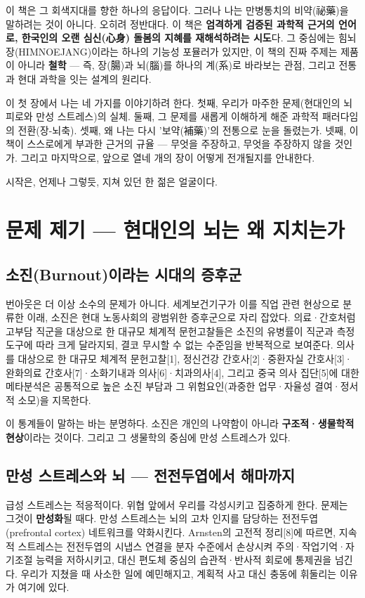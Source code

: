 \documentclass[11pt,oneside]{book}
\begin{document}
이 책은 그 회색지대를 향한 하나의 응답이다. 그러나 나는 만병통치의 비약(祕藥)을 말하려는 것이 아니다. 오히려 정반대다. 이 책은 \textbf{엄격하게 검증된 과학적 근거의 언어로, 한국인의 오랜 심신(心身) 돌봄의 지혜를 재해석하려는 시도}다. 그 중심에는 힘뇌장(HIMNOEJANG)이라는 하나의 기능성 포뮬러가 있지만, 이 책의 진짜 주제는 제품이 아니라 \textbf{철학} — 즉, 장(腸)과 뇌(腦)를 하나의 계(系)로 바라보는 관점, 그리고 전통과 현대 과학을 잇는 설계의 원리다.

이 첫 장에서 나는 네 가지를 이야기하려 한다. 첫째, 우리가 마주한 문제(현대인의 뇌 피로와 만성 스트레스)의 실체. 둘째, 그 문제를 새롭게 이해하게 해준 과학적 패러다임의 전환(장-뇌축). 셋째, 왜 나는 다시 '보약(補藥)'의 전통으로 눈을 돌렸는가. 넷째, 이 책이 스스로에게 부과한 근거의 규율 — 무엇을 주장하고, 무엇을 주장하지 않을 것인가. 그리고 마지막으로, 앞으로 열네 개의 장이 어떻게 전개될지를 안내한다.

시작은, 언제나 그렇듯, 지쳐 있던 한 젊은 얼굴이다.

\section{문제 제기 — 현대인의 뇌는 왜 지치는가}
\subsection{소진(Burnout)이라는 시대의 증후군}
번아웃은 더 이상 소수의 문제가 아니다. 세계보건기구가 이를 직업 관련 현상으로 분류한 이래, 소진은 현대 노동사회의 광범위한 증후군으로 자리 잡았다. 의료·간호처럼 고부담 직군을 대상으로 한 대규모 체계적 문헌고찰들은 소진의 유병률이 직군과 측정도구에 따라 크게 달라지되, 결코 무시할 수 없는 수준임을 반복적으로 보여준다. 의사를 대상으로 한 대규모 체계적 문헌고찰[1], 정신건강 간호사[2]·중환자실 간호사[3]·완화의료 간호사[7]·소화기내과 의사[6]·치과의사[4], 그리고 중국 의사 집단[5]에 대한 메타분석은 공통적으로 높은 소진 부담과 그 위험요인(과중한 업무·자율성 결여·정서적 소모)을 지목한다.

이 통계들이 말하는 바는 분명하다. 소진은 개인의 나약함이 아니라 \textbf{구조적·생물학적 현상}이라는 것이다. 그리고 그 생물학의 중심에 만성 스트레스가 있다.

\subsection{만성 스트레스와 뇌 — 전전두엽에서 해마까지}
급성 스트레스는 적응적이다. 위협 앞에서 우리를 각성시키고 집중하게 한다. 문제는 그것이 \textbf{만성화}될 때다. 만성 스트레스는 뇌의 고차 인지를 담당하는 전전두엽(prefrontal cortex) 네트워크를 약화시킨다. Arnsten의 고전적 정리[8]에 따르면, 지속적 스트레스는 전전두엽의 시냅스 연결을 분자 수준에서 손상시켜 주의·작업기억·자기조절 능력을 저하시키고, 대신 편도체 중심의 습관적·반사적 회로에 통제권을 넘긴다. 우리가 지쳤을 때 사소한 일에 예민해지고, 계획적 사고 대신 충동에 휘둘리는 이유가 여기에 있다.
\end{document}
